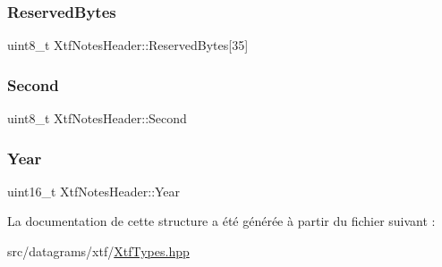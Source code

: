 \subsubsection{\texorpdfstring{Reserved\+Bytes}{ReservedBytes}}
{\footnotesize\ttfamily uint8\+\_\+t Xtf\+Notes\+Header\+::\+Reserved\+Bytes\mbox{[}35\mbox{]}}

\mbox{\label{structXtfNotesHeader_a6ae594b3f7e1d0dad52eb58cb3c6b5d7}} 
\subsubsection{\texorpdfstring{Second}{Second}}
{\footnotesize\ttfamily uint8\+\_\+t Xtf\+Notes\+Header\+::\+Second}

\mbox{\label{structXtfNotesHeader_ac477d6252e2175b05d09c4a10cd201c9}} 
\subsubsection{\texorpdfstring{Year}{Year}}
{\footnotesize\ttfamily uint16\+\_\+t Xtf\+Notes\+Header\+::\+Year}



La documentation de cette structure a été générée à partir du fichier suivant \+:\begin{DoxyCompactItemize}
\item 
src/datagrams/xtf/\hyperlink{XtfTypes_8hpp}{Xtf\+Types.\+hpp}\end{DoxyCompactItemize}

